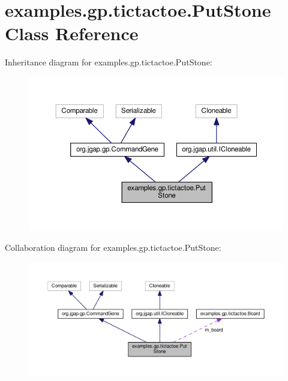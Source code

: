 \hypertarget{classexamples_1_1gp_1_1tictactoe_1_1_put_stone}{\section{examples.\-gp.\-tictactoe.\-Put\-Stone Class Reference}
\label{classexamples_1_1gp_1_1tictactoe_1_1_put_stone}
}


Inheritance diagram for examples.\-gp.\-tictactoe.\-Put\-Stone\-:
\nopagebreak
\begin{figure}[H]
\begin{center}
\leavevmode
\includegraphics[width=350pt]{classexamples_1_1gp_1_1tictactoe_1_1_put_stone__inherit__graph}
\end{center}
\end{figure}


Collaboration diagram for examples.\-gp.\-tictactoe.\-Put\-Stone\-:
\nopagebreak
\begin{figure}[H]
\begin{center}
\leavevmode
\includegraphics[width=350pt]{classexamples_1_1gp_1_1tictactoe_1_1_put_stone__coll__graph}
\end{center}
\end{figure}
